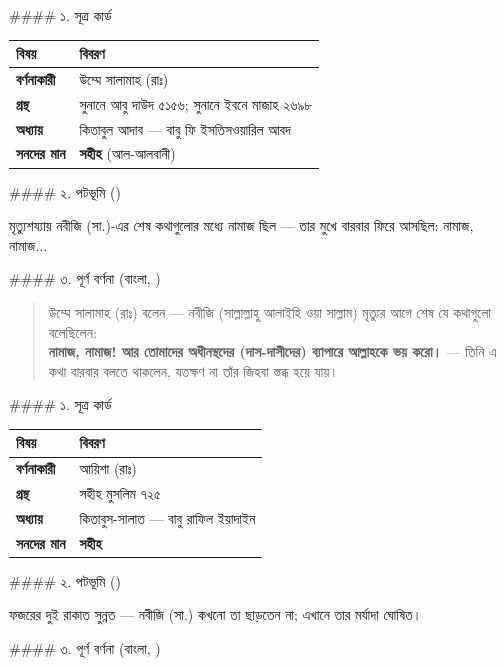 \#\#\#\# ১. সূত্র কার্ড

\begin{table}[h]\centering\small
\begin{tabular}{ll}
বিষয় & বিবরণ \\
\hline
\textbf{বর্ণনাকারী} & উম্মে সালামাহ (রাঃ) \\
\textbf{গ্রন্থ} & সুনানে আবু দাউদ ৫১৫৬; সুনানে ইবনে মাজাহ ২৬৯৮ \\
\textbf{অধ্যায়} & কিতাবুল আদাব — বাবু ফি ইসতিসওয়ারিল আবদ \\
\textbf{সনদের মান} & \textbf{সহীহ} (আল-আলবানী) \\
\hline
\end{tabular}
\end{table}

\#\#\#\# ২. পটভূমি ()

মৃত্যুশয্যায় নবীজি (সা.)-এর শেষ কথাগুলোর মধ্যে নামাজ ছিল — তার মুখে বারবার ফিরে আসছিল: নামাজ, নামাজ...

\#\#\#\# ৩. পূর্ণ বর্ণনা (বাংলা, )

\begin{quote}
উম্মে সালামাহ (রাঃ) বলেন — নবীজি (সাল্লাল্লাহু আলাইহি ওয়া সাল্লাম) মৃত্যুর আগে শেষ যে কথাগুলো বলেছিলেন: \\
\textbf{নামাজ, নামাজ! আর তোমাদের অধীনস্থদের (দাস-দাসীদের) ব্যাপারে আল্লাহকে ভয় করো।} — তিনি এ কথা বারবার বলতে থাকলেন, যতক্ষণ না তাঁর জিহবা স্তব্ধ হয়ে যায়।
\end{quote}

\#\#\#\# ১. সূত্র কার্ড

\begin{table}[h]\centering\small
\begin{tabular}{ll}
বিষয় & বিবরণ \\
\hline
\textbf{বর্ণনাকারী} & আয়িশা (রাঃ) \\
\textbf{গ্রন্থ} & সহীহ মুসলিম ৭২৫ \\
\textbf{অধ্যায়} & কিতাবুস-সালাত — বাবু রাফিল ইয়াদাইন \\
\textbf{সনদের মান} & \textbf{সহীহ} \\
\hline
\end{tabular}
\end{table}

\#\#\#\# ২. পটভূমি ()

ফজরের দুই রাকাত সুন্নত — নবীজি (সা.) কখনো তা ছাড়তেন না; এখানে তার মর্যাদা ঘোষিত।

\#\#\#\# ৩. পূর্ণ বর্ণনা (বাংলা, )

